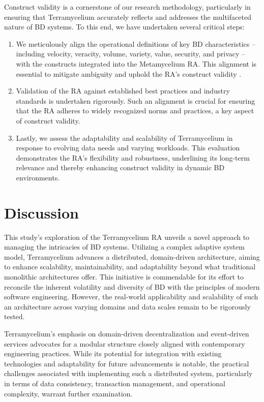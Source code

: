 \documentclass[journal]{IEEEtran}
\begin{document}
Construct validity is a cornerstone of our research methodology, particularly in ensuring that Terramycelium accurately reflects and addresses the multifaceted nature of BD systems. To this end, we have undertaken several critical steps:

\begin{enumerate}
    \item We meticulously align the operational definitions of key BD characteristics -- including velocity, veracity, volume, variety, value, security, and privacy -- with the constructs integrated into the Metamycelium RA. This alignment is essential to mitigate ambiguity and uphold the RA's construct validity \cite{rad2017big}.
    
    
    \item Validation of the RA against established best practices and industry standards is undertaken rigorously. Such an alignment is crucial for ensuring that the RA adheres to widely recognized norms and practices, a key aspect of construct validity.
    
    \item Lastly, we assess the adaptability and scalability of Terramycelium in response to evolving data needs and varying workloads. This evaluation demonstrates the RA's flexibility and robustness, underlining its long-term relevance and thereby enhancing construct validity in dynamic BD environments.
\end{enumerate}



\section{Discussion}

This study's exploration of the Terramycelium RA unveils a novel approach to managing the intricacies of BD systems. Utilizing a complex adaptive system model, Terramycelium advances a distributed, domain-driven architecture, aiming to enhance scalability, maintainability, and adaptability beyond what traditional monolithic architectures offer. This initiative is commendable for its effort to reconcile the inherent volatility and diversity of BD with the principles of modern software engineering. However, the real-world applicability and scalability of such an architecture across varying domains and data scales remain to be rigorously tested.

Terramycelium's emphasis on domain-driven decentralization and event-driven services advocates for a modular structure closely aligned with contemporary engineering practices. While its potential for integration with existing technologies and adaptability for future advancements is notable, the practical challenges associated with implementing such a distributed system, particularly in terms of data consistency, transaction management, and operational complexity, warrant further examination.
\end{document}
